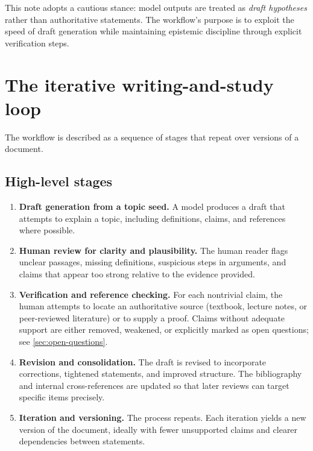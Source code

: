 \documentclass[11pt,a4paper]{article}
\theoremstyle{definition}
\theoremstyle{remark}
\begin{document}
This note adopts a cautious stance: model outputs are treated as \emph{draft hypotheses} rather than authoritative statements. The workflow’s purpose is to exploit the speed of draft generation while maintaining epistemic discipline through explicit verification steps.

\section{The iterative writing-and-study loop}
\label{sec:loop}

The workflow is described as a sequence of stages that repeat over versions of a document.

\subsection{High-level stages}
\label{sec:stages}

\begin{enumerate}
  \item \textbf{Draft generation from a topic seed.} A model produces a draft that attempts to explain a topic, including definitions, claims, and references where possible.

  \item \textbf{Human review for clarity and plausibility.} The human reader flags unclear passages, missing definitions, suspicious steps in arguments, and claims that appear too strong relative to the evidence provided.

  \item \textbf{Verification and reference checking.} For each nontrivial claim, the human attempts to locate an authoritative source (textbook, lecture notes, or peer-reviewed literature) or to supply a proof. Claims without adequate support are either removed, weakened, or explicitly marked as open questions; see \cref{sec:open-questions}.

  \item \textbf{Revision and consolidation.} The draft is revised to incorporate corrections, tightened statements, and improved structure. The bibliography and internal cross-references are updated so that later reviews can target specific items precisely.

  \item \textbf{Iteration and versioning.} The process repeats. Each iteration yields a new version of the document, ideally with fewer unsupported claims and clearer dependencies between statements.
\end{enumerate}
\end{document}
